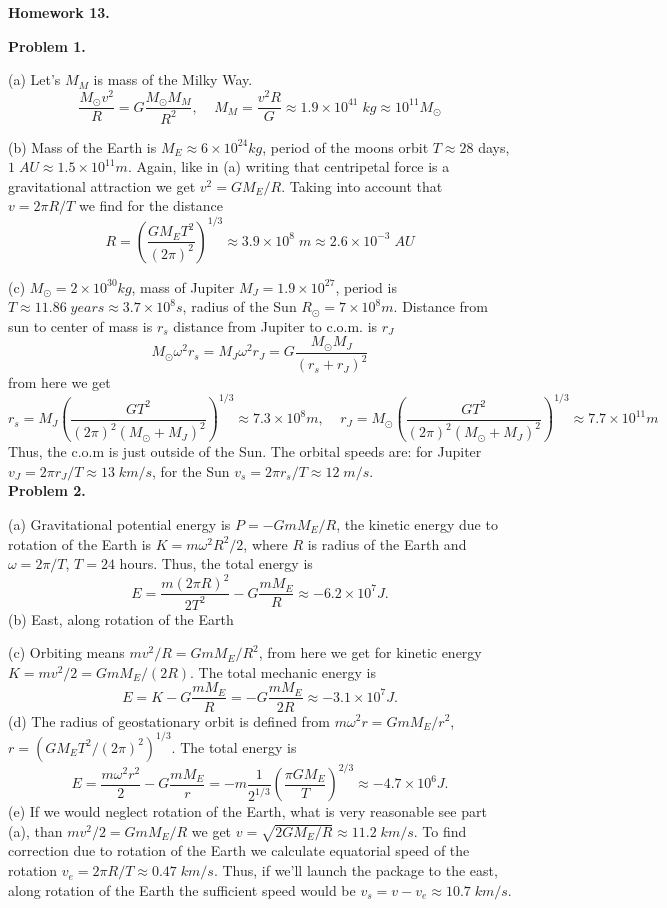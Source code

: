 \documentclass[12pt]{article}
\begin{document}
\begin{center}
{\bf\large Homework 13.}
\end{center}

{\bf Problem 1.}

(a) Let's $M_M$ is mass of the Milky Way.
$$\frac{M_{\odot}v^2}{R}=G\frac{M_{\odot}M_M}{R^2},\;\;\;\;M_M=\frac{v^2 R}{G}\approx1.9\times 10^{41}\;kg\approx 10^{11} M_{\odot}$$ 

(b) Mass of the Earth is $M_E\approx6\times 10^{24}kg$, period of the moons orbit $T\approx 28$ days, $1\;AU\approx 1.5\times 10^{11} m$. Again, like in (a) writing that centripetal force is a gravitational attraction we get
$v^2=G M_E/R$. Taking into account that $v=2\pi R/T$ we find for the distance
$$R=\left(\frac{G M_E T^2}{(2\pi)^2}\right)^{1/3}\approx 3.9\times 10^8\;m\approx2.6\times 10^{-3} \;AU$$

(c) $M_{\odot}=2\times 10^{30}kg$, mass of Jupiter $M_J=1.9\times 10^{27}$, period is $T\approx 11.86\;years\approx3.7\times 10^8 s$, radius of the Sun $R_{\odot}=7\times 10^8 m$. 
Distance from sun to center of mass is $r_s$ distance from Jupiter to c.o.m. is $r_J$
$$M_{\odot}\omega^2 r_s=M_J\omega^2 r_J=G\frac{M_{\odot}M_J}{(r_s+r_J)^2}$$
from here we get
$$r_s=M_J\left(\frac{G T^2}{(2\pi)^2(M_{\odot}+M_J)^2}\right)^{1/3}\approx7.3\times10^8 m,\;\;\;\;r_J=M_{\odot}\left(\frac{G T^2}{(2\pi)^2(M_{\odot}+M_J)^2}\right)^{1/3}\approx 7.7\times 10^{11}m$$
 Thus, the c.o.m is just outside of the Sun. The orbital speeds are: for Jupiter $v_J=2\pi r_J/T\approx13\;km/s$,
 for the Sun $v_s=2\pi r_s/T\approx12\;m/s$.
 \\

{\bf Problem 2.}   

(a) Gravitational potential energy is $P=-G m M_E/R$, the kinetic energy due to rotation of the Earth is $K=m\omega^2 R^2/2$, where $R$ is radius of the Earth and $\omega=2\pi/T$, $T=24$ hours.
Thus, the total energy is
$$E=\frac{m (2\pi R)^2}{2 T^2} -G\frac{m M_E}{R}\approx-6.2\times 10^{7} J.$$
(b) East, along rotation of the Earth

(c) Orbiting means $m v^2/R=G m M_E/R^2$, from here we get for kinetic energy
$K=mv^2/2=G m M_E/(2 R)$. The total mechanic energy is
$$E=K-G\frac{m M_E}{R}=-G\frac{m M_E}{2R}\approx-3.1\times10^7 J.$$
(d) The radius of geostationary orbit is defined from
$m\omega^2 r=G mM_E/r^2$, $r=\left( GM_E T^2/(2\pi)^2\right)^{1/3}$.
The total energy is
$$E=\frac{m\omega^2 r^2}{2}-G\frac{m M_E}{r}=-m \frac{1}{2^{1/3}}\left(\frac{\pi G M_E}{T}\right)^{2/3}\approx-4.7\times 10^6 J.$$
(e) If we would neglect rotation of the Earth, what is very reasonable see part (a), than
$mv^2/2=G m M_E/R$ we get $v=\sqrt{2 G M_E/R}\approx11.2\;km/s$. To find correction due to
rotation of the Earth we calculate equatorial speed of the rotation $v_e=2\pi R/T\approx0.47\;km/s$.
Thus, if we'll launch the package to the east, along rotation of the Earth the sufficient speed
would be $v_s=v-v_e\approx 10.7\;km/s$.
\\
\end{document}
